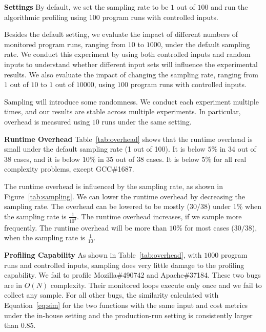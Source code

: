 



\noindent\textbf{Settings}
By default, we set the sampling rate to be $1$ out of $100$ 
and run the algorithmic profiling using $100$ program runs with controlled inputs.  

Besides the default setting,
we evaluate the impact of different numbers of monitored program runs, 
ranging from $10$ to $1000$, under the default sampling rate.
We conduct this experiment by using both controlled inputs and random inputs 
to understand whether different input sets will influence the experimental results.
We also evaluate the impact of changing the sampling rate, ranging from $1$ out of $10$ to $1$ out of $10000$, 
using $100$ program runs with controlled inputs.  

Sampling will introduce some randomness. 
We conduct each experiment multiple times, 
and our results are stable across multiple experiments. 
In particular, overhead is measured using $10$ runs under the same setting. 

\noindent\textbf{Runtime Overhead}
Table~\ref{tab:overhead} shows that the runtime overhead is small under the 
default sampling rate (1 out of 100).
It is below $5\%$ in $34$ out of $38$ cases, 
and it is below $10\%$ in $35$ out of $38$ cases. 
It is below $5\%$ for all real complexity problems, 
except GCC\#1687. 

The runtime overhead is influenced by the sampling rate, 
as shown in Figure~\ref{tab:sampling}.
We can lower the runtime overhead by decreasing the sampling rate.
The overhead can be lowered to be mostly ($30/38$) 
under $1\%$ when the sampling rate is $\frac{1}{10^4}$.
The runtime overhead increases, 
if we sample more frequently.
The runtime overhead will be more than $10\%$ for most cases ($30/38$), 
when the sampling rate is $\frac{1}{10}$.

\noindent\textbf{Profiling Capability}
As shown in Table~\ref{tab:overhead}, 
with $1000$ program runs and controlled inputs, 
sampling does very little damage to the profiling capability. 
We fail to profile Mozilla\#490742 and Apache\#37184.
These two bugs are in $O(N)$ complexity. 
Their monitored loops execute only once 
and we fail to collect any sample.
For all other bugs, 
the similarity calculated with Equation~\ref{eq:sim} for the two functions with the same input and cost metrics
under the in-house setting and the production-run setting is consistently larger than $0.85$.

